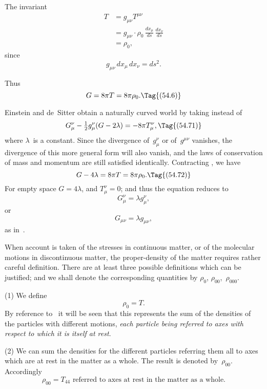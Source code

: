 \documentclass[12pt]{book}
\begin{document}
The invariant
\begin{align*}
  T &= g_{\mu\nu} T^{\mu\nu} \\
  &= g_{\mu\nu} \cdot \rho_{0}\, \frac{dx_{\mu}}{ds}\, \frac{dx_{\nu}}{ds} \\
  &= \rho_{0},
\end{align*}
since
\[
g_{\mu\nu}\, dx_{\mu}\, dx_{\nu} = ds^{2}.
\]

Thus
\[
G = 8\pi T = 8\pi \rho_{0}.
\Tag{(54.6)}
\]

Einstein and de~Sitter obtain a naturally curved world by taking instead
of~
\[
G_{\mu}^{\nu} - \tfrac{1}{2}g_{\mu}^{\nu}(G - 2\lambda) = -8\pi T_{\mu}^{\nu},
\Tag{(54.71)}
\]
where $\lambda$~is a constant. Since the divergence of~$g_{\mu}^{\nu}$ or of~$g^{\mu\nu}$ vanishes, the
divergence of this more general form will also vanish, and the laws of conservation
of mass and momentum are still satisfied identically. Contracting
, we have
\[
G - 4\lambda = 8\pi T = 8\pi \rho_{0}.
\Tag{(54.72)}
\]
For empty space $G = 4\lambda$, and $T_{\mu}^{\nu} = 0$; and thus the equation reduces to
\[
G_{\mu}^{\nu} = \lambda g_{\mu}^{\nu},
\]
or
\[
G_{\mu\nu} = \lambda g_{\mu\nu},
\]
as in~.

When account is taken of the stresses in continuous matter, or of the
%
molecular motions in discontinuous matter, the proper\hyp{}density of the matter
%
requires rather careful definition. There are at least three possible definitions
which can be justified; and we shall denote the corresponding quantities by
$\rho_{0}$, $\rho_{00}$,~$\rho_{000}$.

(1) We define
\[
\rho_{0} = T.
\]
By reference to~ it will be seen that this represents the sum of the
densities of the particles with different motions, \emph{each particle being referred
to axes with respect to which it is itself at rest}.

(2) We can sum the densities for the different particles referring them
all to axes which are at rest in the matter as a whole. The result is denoted
by~$\rho_{00}$. Accordingly
\[
\text{$\rho_{00} = T_{44}$ referred to axes at rest in the matter as a whole.}
\]
\end{document}
